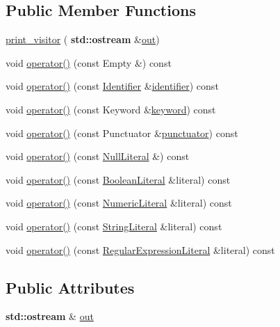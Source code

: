\subsection*{Public Member Functions}
\begin{DoxyCompactItemize}
\item 
\hyperlink{struct_token_1_1print__visitor_ae7203227ece074fd22543fd99e81dfc4}{print\+\_\+visitor} (\textbf{ std\+::ostream} \&\hyperlink{struct_token_1_1print__visitor_a9b32ad27a09d9c03df39a1b11bb6d638}{out})
\item 
void \hyperlink{struct_token_1_1print__visitor_aea3ede94932e7bc862d225768a289b22}{operator()} (const Empty \&) const
\item 
void \hyperlink{struct_token_1_1print__visitor_aa552b084f27de8bfeb5683bbd7e22965}{operator()} (const \hyperlink{struct_identifier}{Identifier} \&\hyperlink{class_token_a15dc839f68c100e6041c7ca089ea9005}{identifier}) const
\item 
void \hyperlink{struct_token_1_1print__visitor_a36d0662b3d8a3ae257a318d71a96e5ba}{operator()} (const Keyword \&\hyperlink{class_token_a8c0612a3b0a9b6eb05dfd9e75aafcb33}{keyword}) const
\item 
void \hyperlink{struct_token_1_1print__visitor_af16c79081b866ab87dda15bbc1a49edf}{operator()} (const Punctuator \&\hyperlink{class_token_aef1c084308395ed9ad7328a6aa321e5a}{punctuator}) const
\item 
void \hyperlink{struct_token_1_1print__visitor_a402d1a387fdaa8c5b443718c6cd0697c}{operator()} (const \hyperlink{struct_null_literal}{Null\+Literal} \&) const
\item 
void \hyperlink{struct_token_1_1print__visitor_ab88df6a9d1f1a1d80dc08d5f65ab3cbb}{operator()} (const \hyperlink{struct_boolean_literal}{Boolean\+Literal} \&literal) const
\item 
void \hyperlink{struct_token_1_1print__visitor_a2f78dce7fa82bde5d398665bd4937d52}{operator()} (const \hyperlink{struct_numeric_literal}{Numeric\+Literal} \&literal) const
\item 
void \hyperlink{struct_token_1_1print__visitor_a495929c1887c05a00f116c19107dab75}{operator()} (const \hyperlink{struct_string_literal}{String\+Literal} \&literal) const
\item 
void \hyperlink{struct_token_1_1print__visitor_a7507bdda946c495193de27afd742572f}{operator()} (const \hyperlink{struct_regular_expression_literal}{Regular\+Expression\+Literal} \&literal) const
\end{DoxyCompactItemize}
\subsection*{Public Attributes}
\begin{DoxyCompactItemize}
\item 
\textbf{ std\+::ostream} \& \hyperlink{struct_token_1_1print__visitor_a9b32ad27a09d9c03df39a1b11bb6d638}{out}
\end{DoxyCompactItemize}


